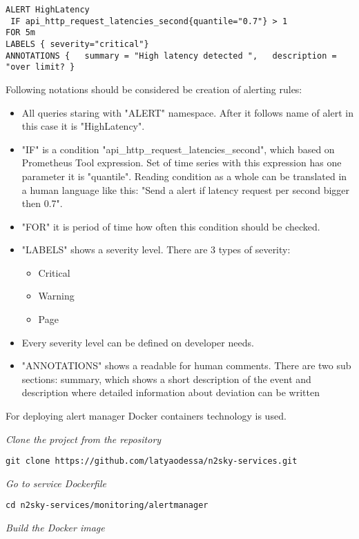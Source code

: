  \begin{lstlisting}
ALERT HighLatency
 IF api_http_request_latencies_second{quantile="0.7"} > 1 
FOR 5m 
LABELS { severity="critical"} 
ANNOTATIONS {   summary = "High latency detected ",   description = "over limit? } 
\end{lstlisting}

Following notations should be considered be creation of alerting rules:
\begin{itemize}
\item All queries staring with "ALERT" namespace. After it follows name of alert in this case it is "HighLatency".  
\item "IF" is a condition "api\_http\_request\_latencies\_second", which based on Prometheus Tool expression.  Set of time series with this expression has one parameter it is "quantile". Reading condition as a whole can be translated in a human language like this: "Send a alert if latency request per second bigger then 0.7". 
\item "FOR" it is period of time how often this condition should be checked. 
\item "LABELS" shows a severity level. There are 3 types of severity:
\begin{itemize} 
        \item Critical
        \item Warning
        \item Page
     \end{itemize}
\item Every severity level can be defined on developer needs.
\item "ANNOTATIONS" shows a readable for human comments. There are two sub sections: summary, which shows a short description of the event and description where detailed information about deviation can be written
\end{itemize}

For deploying alert manager Docker containers technology is used.

\emph{Clone the project from the repository}
 \begin{lstlisting}
git clone https://github.com/latyaodessa/n2sky-services.git 
\end{lstlisting}


\emph{Go to service Dockerfile}
 \begin{lstlisting}
cd n2sky-services/monitoring/alertmanager
\end{lstlisting}

\emph{Build the Docker image}

